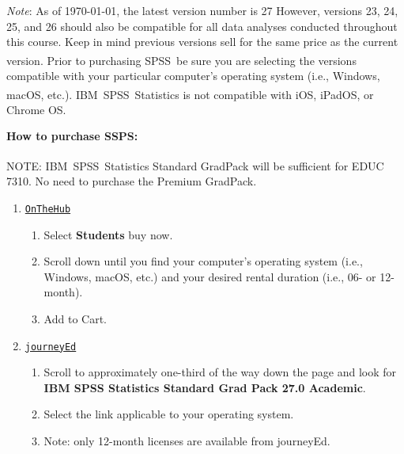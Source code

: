 \documentclass[
]{article}
\providecommand{\tightlist}{%
  \setlength{\itemsep}{0pt}\setlength{\parskip}{0pt}}
\begin{document}
\emph{Note}: As of \today, the latest version number is 27 However,
versions 23, 24, 25, and 26 should also be compatible for all data
analyses conducted throughout this course. Keep in mind previous
versions sell for the same price as the current version. Prior to
purchasing SPSS\textsuperscript{\textregistered}~be sure you are
selecting the versions compatible with your particular computer's
operating system (i.e., Windows, macOS, etc.).
IBM\textsuperscript{\textregistered}~SPSS\textsuperscript{\textregistered}~Statistics
is not compatible with iOS, iPadOS, or Chrome OS.

\textbf{How to purchase SSPS:}

\begin{tcolorbox}
[width=\linewidth, sharp corners=all, colback=white!95!red]
NOTE: IBM\textsuperscript{\textregistered}\ SPSS\textsuperscript{\textregistered}\ Statistics Standard GradPack will be sufficient for EDUC 7310. No need to purchase the Premium GradPack.
\end{tcolorbox}

\begin{enumerate}
\def\labelenumi{\arabic{enumi}.}
\tightlist
\item
  \texttt{\href{https://onthehub.com/spss/}{OnTheHub}}

  \begin{enumerate}
  \def\labelenumii{\arabic{enumii}.}
  \tightlist
  \item
    Select \textbf{Students} buy now.
  \item
    Scroll down until you find your computer's operating system (i.e.,
    Windows, macOS, etc.) and your desired rental duration (i.e., 06- or
    12-month).
  \item
    Add to Cart.
  \end{enumerate}
\item
  \texttt{\href{https://www.journeyed.com/products/IBM+SPSS/IBM+SPSS+Statistics}{journeyEd}}

  \begin{enumerate}
  \def\labelenumii{\arabic{enumii}.}
  \tightlist
  \item
    Scroll to approximately one-third of the way down the page and look
    for \textbf{IBM SPSS Statistics Standard Grad Pack 27.0 Academic}.
  \item
    Select the link applicable to your operating system.
  \item
    Note: only 12-month licenses are available from journeyEd.
  \end{enumerate}
\end{enumerate}
\end{document}
